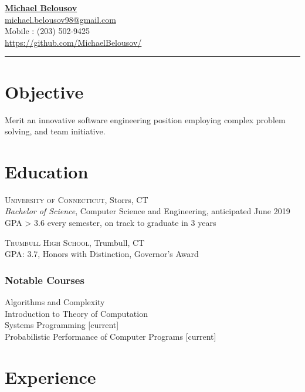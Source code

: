 \documentclass[Letterpaper,11pt]{article}
\begin{document}
\setlength{\parindent}{0em}
\setlength{\parskip}{1em}
\setlength{\parsep}{1em}
\setlength{\itemsep}{0.2em}
\setlength{\headsep}{0.2em}
\setlength{\topskip}{0.2em}
\setlength{\topmargin}{0.2em}
\setlength{\topsep}{0.2em}
\setlength{\partopsep}{0.2em}
\setlength{\columnsep}{1em}

\addtolength{\topmargin}{-2em}

\textbf{\href{mailto:michael.belousov98@gmail.com}{\Large Michael Belousov}}\\ 
\href{mailto:michael.belousov98@gmail.com}{michael.belousov98@gmail.com}\\  
Mobile : (203) 502-9425\\
\href{https://github.com/MichaelBelousov/}{https://github.com/MichaelBelousov/}\\  
\hrule

\section*{Objective}

Merit an innovative software engineering position employing complex problem solving, and team initiative.

\section*{Education}
    
    \textsc{University of Connecticut}, Storrs, CT\\
    \textit{Bachelor of Science}, Computer Science and Engineering, anticipated June 2019\\
    GPA > 3.6 every semester, on track to graduate in 3 years

    \textsc{Trumbull High School}, Trumbull, CT\\
    GPA: 3.7, Honors with Distinction, Governor's Award

    \subsubsection*{Notable Courses}
    Algorithms and Complexity\\
    Introduction to Theory of Computation\\
    Systems Programming [current]\\
    Probabilistic Performance of Computer Programs [current]

\section*{Experience}
\end{document}
